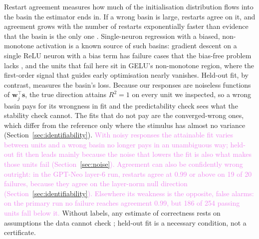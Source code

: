 \documentclass[10pt]{article}
\newcommand{\draft}[1]{\textcolor{violet}{#1}}
\begin{document}
Restart agreement measures how much of the initialisation distribution flows into the basin
the estimator ends in. If a wrong basin is large, restarts agree on it, and agreement grows
with the number of restarts exponentially faster than evidence that the basin is the only one
\citep{nehzati2026restarts}. Single-neuron regression with a biased, non-monotone activation is
a known source of such basins: gradient descent on a single ReLU neuron with a bias term has failure
cases that the bias-free problem lacks \citep{vardi2021learning}, and the units that fail here sit
in GELU's non-monotone region, where the first-order signal that guides early optimisation
nearly vanishes. Held-out fit, by contrast, measures the basin's loss. Because our
responses are noiseless functions of $\mathbf{w}_j^\top\mathbf{s}$, the true direction attains
$R^2 = 1$ on every unit we inspected, so a wrong basin pays for its wrongness in fit and the
predictability check sees what the stability check cannot. The fits that do not pay are the
converged-wrong ones, which differ from the reference only where the stimulus has almost no
variance (Section~\ref{sec:identifiability}). \draft{With noisy responses the attainable fit
varies between units and a wrong basin no longer pays in an unambiguous way; held-out fit then
leads mainly because the noise that lowers the fit is also what makes those units fail
(Section~\ref{sec:noise}). Agreement can also be confidently wrong outright: in the GPT-Neo
layer-6 run, restarts agree at 0.99 or above on 19 of 20 failures, because they agree on the
layer-norm null direction (Section~\ref{sec:identifiability}).}\draft{ Elsewhere its weakness is
the opposite, false alarms: on the primary run no failure reaches agreement 0.99, but 186 of
254 passing units fall below it.} Without labels, any estimate of correctness rests on assumptions the data cannot check
\citep{garg2022leveraging}; held-out fit is a
necessary condition, not a certificate.
\end{document}
